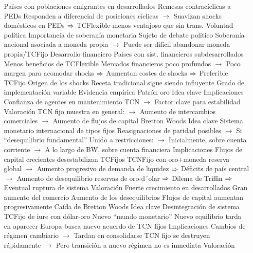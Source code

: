 \documentclass{nuevotema}
\begin{document}
\begin{esquemal}
				\4 Países con poblaciones emigrantes en desarrollados
				\4[] Remesas contracíclicas a PEDs
				\4[] Responden a diferencial de posiciones cíclicas
				\4[] $\to$ Suavizan shocks domésticos en PEDs
				\4[] $\Rightarrow$ TCFlexible menos ventajoso que sin trans.
			 Voluntad política
				\4 Importancia de soberanía monetaria
				\4[] Sujeto de debate político
				\4[] Soberanía nacional asociada a moneda propia
				\4[] $\to$ Puede ser difícil abandonar moneda propia/TCFijo
			 Desarrollo financiero
				\4 Países con sist. financieros subdesarrollados
				\4[] Menos beneficios de TCFlexible
				\4[] Mercados financieros poco profundos
				\4[] $\to$ Poco margen para acomodar shocks
				\4[] $\Rightarrow$ Aumentan costes de shocks
				\4[] $\Rightarrow$ Preferible TCFijo
			\3[\textsc{ix}] Origen de los shocks
				\4 Receta tradicional sigue siendo influyente
				\4 Grado de implementación variable
		\2 Evidencia empírica
			\3 Patrón oro
				\4 Idea clave
				\4 Implicaciones
				\4[] Confianza de agentes en mantenimiento TCN
				\4[] $\to$ Factor clave para estabilidad
				\4 Valoración
				\4[] TCN fijo muestra en general:
				\4[] $\to$ Aumento de intercambios comerciales
				\4[] $\to$ Aumento de flujos de capital
			\3 Bretton Woods
				\4 Idea clave
				\4[] Sistema monetario internacional de tipos fijos
				\4[] Reasignaciones de paridad posibles
				\4[] $\to$ Si ``desequilibrio fundamental''
				\4[] Unido a restricciones:
				\4[] $\to$ Inicialmente, sobre cuenta corriente
				\4[] $\to$ A lo largo de BW, sobre cuenta financiera
				\4 Implicaciones
				\4[] Flujos de capital crecientes desestabilizan TCFijos
				\4[] TCNFijo con oro+moneda reserva global
				\4[] $\to$ Aumento progresivo de demanda de liquidez
				\4[] $\Rightarrow$ Déficits de país central
				\4[] $\to$ Aumento de desequilibrio reservas de oro-d´olar
				\4[] $\Rightarrow$ Dilema de Triffin
				\4[] $\Rightarrow$ Eventual ruptura de sistema
				\4 Valoración
				\4[] Fuerte crecimiento en desarrollados
				\4[] Gran aumento del comercio
				\4[] Aumento de los desequilibrios
				\4[] Flujos de capital aumentan progresivamente
			\3 Caída de Bretton Woods
				\4 Idea clave
				\4[] Desintegración de sistema TCFijo de iure con dólar-oro
				\4[] Nuevo ``mundo monetario''
				\4[] Nuevo equilibrio tarda en aparecer
				\4[] Europa busca nuevo acuerdo de TCN fijos
				\4 Implicaciones
				\4[] Cambios de régimen cambiario
				\4[] $\to$ Tardan en consolidarse
				\4[] TCN fijo se destruyen rápidamente
				\4[] $\to$ Pero transición a nuevo régimen no es inmediata
				\4 Valoración

\end{esquemal}
\end{document}
